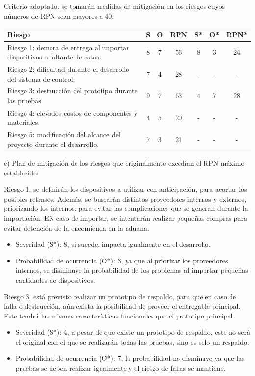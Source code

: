 \documentclass[
11pt, %
]{charter}
\begin{document}
Criterio adoptado: se tomarán medidas de mitigación en los riesgos cuyos números de RPN sean mayores a 40. 

\begin{table}[htpb]
\centering
\begin{tabularx}{\linewidth}{@{}|X|c|c|c|c|c|c|@{}}
\hline
\rowcolor[HTML]{C0C0C0} 
Riesgo & S & O & RPN & S* & O* & RPN* \\ \hline
   Riesgo 1: demora de entrega al importar dispositivos o faltante de estos.    & 8  & 7  &  56   &  8  &  3  &  24    \\ \hline
   Riesgo 2: dificultad durante el desarrollo del sistema de control.    & 7  & 4  &  28   &  -  &  -  &   -   \\ \hline
   Riesgo 3: destrucción del prototipo durante las pruebas.    & 9  & 7  &  63   &  4  & 7   &  28    \\ \hline
   Riesgo 4: elevados costos de componentes y materiales.    &  4 & 5  &  20   &  -  &  -  &   -   \\ \hline
   Riesgo 5: modificación del alcance del proyecto durante el desarrollo.    & 7  & 3  &  21   &  -  &  -  &   -   \\ \hline
\end{tabularx}%
\end{table}

c) Plan de mitigación de los riesgos que originalmente excedían el RPN máximo establecido:

Riesgo 1: se definirán los dispositivos a utilizar con anticipación, para acortar los posibles retrasos. Además, se buscarán distintos proveedores internos y externos, priorizando los internos, para evitar las complicaciones que se generan durante la importación. EN caso de importar, se intentarán realizar pequeñas compras para evitar detención de la encomienda en la aduana.

  \begin{itemize}
	\item Severidad (S*): 8, si sucede. impacta igualmente en el desarrollo.
	\item Probabilidad de ocurrencia (O*): 3, ya que al priorizar los proveedores internos, se disminuye la probabilidad de los problemas al importar pequeñas cantidades de dispositivos.
	\end{itemize}

Riesgo 3: está previsto realizar un prototipo de respaldo, para que en caso de falla o destrucción, aún exista la posibilidad de proveer el entregable principal. Este tendrá las mismas características funcionales que el prototipo principal.
  \begin{itemize}
	\item Severidad (S*): 4, a pesar de que existe un prototipo de respaldo, este no será el original con el que se realizarán todas las pruebas, sino es solo un respaldo.
	\item Probabilidad de ocurrencia (O*): 7, la probabilidad no disminuye ya que las pruebas se deben realizar igualmente y el riesgo de fallas se mantiene.
	\end{itemize}
\end{document}

